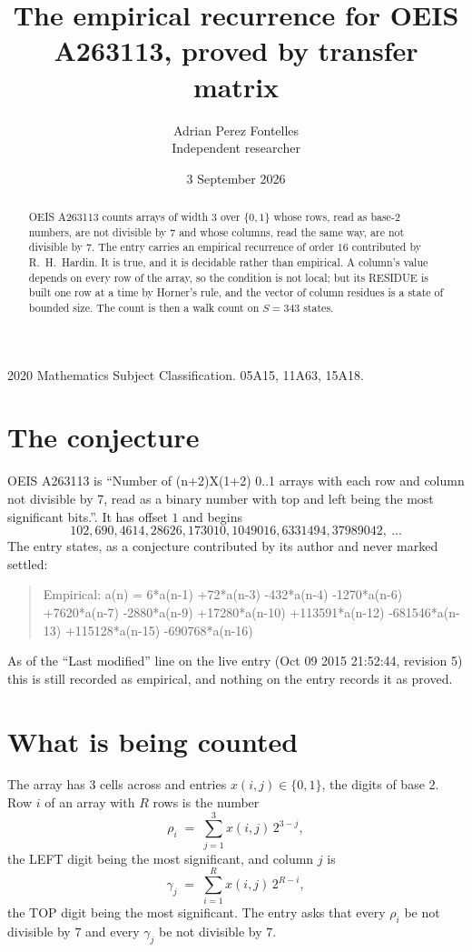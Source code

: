 \documentclass[11pt,a4paper]{article}
\title{The empirical recurrence for OEIS A263113, proved by transfer matrix}
\author{Adrian Perez Fontelles\\ \small Independent researcher}
\date{3 September 2026}
\theoremstyle{plain}
\theoremstyle{definition}
\begin{document}
\maketitle

\begin{abstract}
OEIS A263113 counts arrays of width $3$ over $\{0,1\}$ whose rows, read as base-$2$
numbers, are not divisible by $7$ and whose columns, read the same way, are not divisible by
$7$. The entry carries an empirical recurrence of order $16$ contributed by
R.~H.~Hardin. It is true, and it is decidable rather than empirical. A column's value depends on
every row of the array, so the condition is not local; but its RESIDUE is built one row at a
time by Horner's rule, and the vector of column residues is a state of bounded size. The count
is then a walk count on $S=343$ states.
\end{abstract}

\noindent\small 2020 Mathematics Subject Classification. 05A15, 11A63, 15A18.\normalsize

\section{The conjecture}

OEIS A263113 is ``Number of (n+2)X(1+2) 0..1 arrays with each row and column not divisible by 7, read as a binary number with top and left being the most significant bits.''. It has offset $1$ and begins
\[
102, 690, 4614, 28626, 173010, 1049016, 6331494, 37989042,\ \dots
\]
The entry states, as a conjecture contributed by its author and never marked settled:
\begin{quote}
Empirical: a(n) = 6*a(n-1) +72*a(n-3) -432*a(n-4) -1270*a(n-6) +7620*a(n-7) -2880*a(n-9) +17280*a(n-10) +113591*a(n-12) -681546*a(n-13) +115128*a(n-15) -690768*a(n-16)
\end{quote}
As of the ``Last modified'' line on the live entry (Oct 09 2015 21:52:44, revision 5) this is still
recorded as empirical, and nothing on the entry records it as proved.

\section{What is being counted}

The array has $3$ cells across and entries $x(i,j)\in\{0,1\}$, the digits of
base $2$. Row $i$ of an array with $R$ rows is the number
\[
\rho_i\;=\;\sum_{j=1}^{3}x(i,j)\,2^{3-j} ,
\]
the LEFT digit being the most significant, and column $j$ is
\[
\gamma_j\;=\;\sum_{i=1}^{R}x(i,j)\,2^{R-i} ,
\]
the TOP digit being the most significant. The entry asks that every $\rho_i$ be not divisible by
$7$ and every $\gamma_j$ be not divisible by $7$.
\end{document}
